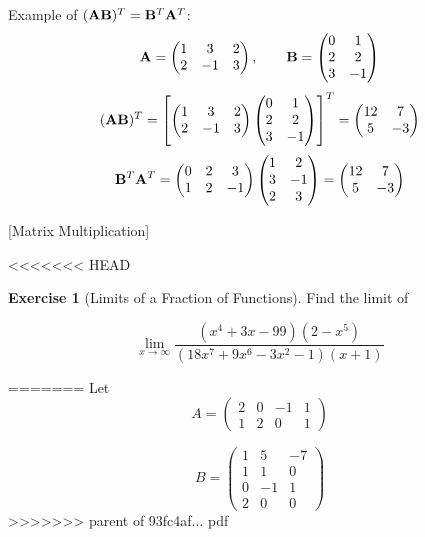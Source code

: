\documentclass[]{book}
\theoremstyle{definition}
\theoremstyle{definition}
\theoremstyle{definition}
\newtheorem{exercise}{Exercise}[chapter]
\theoremstyle{remark}
\begin{document}
Example of \(({\bf AB})^T = {\bf B}^T{\bf A}^T\):
\[{\bf A}=\begin{pmatrix} 1&3&2\\2&-1&3\end{pmatrix}, \qquad {\bf B}=\begin{pmatrix} 0&1\\2&2\\3&-1\end{pmatrix}\]
\[ ({\bf AB})^T = \left[ \begin{pmatrix} 1&3&2\\2&-1&3\end{pmatrix} \begin{pmatrix} 0&1\\2&2\\3&-1\end{pmatrix} \right]^T = \begin{pmatrix} 12&7\\5&-3 \end{pmatrix}\]
\[ {\bf B}^T{\bf A}^T= \begin{pmatrix} 0&2&3\\1&2&-1 \end{pmatrix}  \begin{pmatrix} 1&2\\3&-1\\2&3 \end{pmatrix} = \begin{pmatrix} 12&7\\5&-3 \end{pmatrix}\]

[Matrix Multiplication]
\protect\hypertarget{exr:matrixmulti1}{}{\label{exr:matrixmulti1} {} }

<<<<<<< HEAD
\begin{exercise}[Limits of a Fraction of Functions]
\protect\hypertarget{exr:limfunmax}{}{\label{exr:limfunmax} {} }
Find the limit of

\[\lim_{x\to\infty} \frac{(x^4 +3x−99)(2−x^5)}{(18x^7 +9x^6 −3x^2 −1)(x+1)}\]
\end{exercise}
=======
Let \[A =  \begin{pmatrix} 2&0&-1&1\\1&2&0&1 \end{pmatrix}\]

\[B = \begin{pmatrix} 1&5&-7\\1&1&0\\0&-1&1\\2&0&0\end{pmatrix} \]
>>>>>>> parent of 93fc4af... pdf
\end{document}
